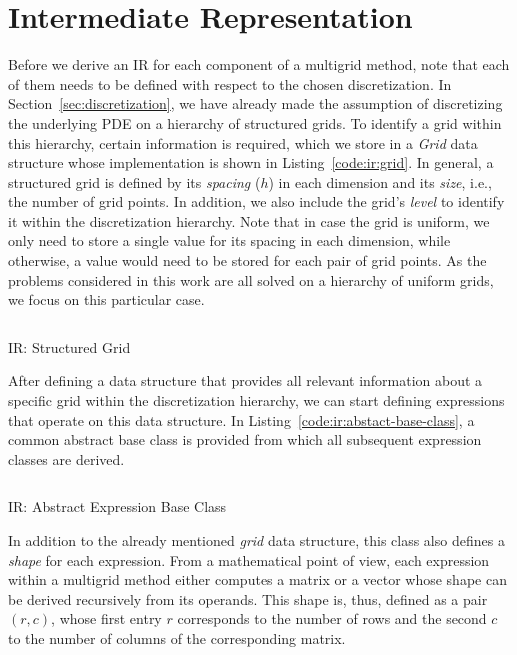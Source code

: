 \section{Intermediate Representation}
\label{sec:intermediate-representation}
Before we derive an IR for each component of a multigrid method, note that each of them needs to be defined with respect to the chosen discretization.
In Section~\ref{sec:discretization}, we have already made the assumption of discretizing the underlying PDE on a hierarchy of structured grids.
To identify a grid within this hierarchy, certain information is required, which we store in a \emph{Grid} data structure whose implementation is shown in Listing~\ref{code:ir:grid}.
In general, a structured grid is defined by its \emph{spacing} ($h$) in each dimension and its \emph{size}, i.e., the number of grid points.
In addition, we also include the grid's \emph{level} to identify it within the discretization hierarchy.
Note that in case the grid is uniform, we only need to store a single value for its spacing in each dimension, while otherwise, a value would need to be stored for each pair of grid points.
As the problems considered in this work are all solved on a hierarchy of uniform grids, we focus on this particular case.
\begin{listing}
	\inputminted{python}{evostencils/ir/grid.py}
	\caption{IR: Structured Grid}
	\label{code:ir:grid}
\end{listing}
After defining a data structure that provides all relevant information about a specific grid within the discretization hierarchy, we can start defining expressions that operate on this data structure.
In Listing~\ref{code:ir:abstact-base-class}, a common abstract base class is provided from which all subsequent expression classes are derived.
\begin{listing}
	\inputminted{python}{evostencils/ir/expression.py}
	\caption{IR: Abstract Expression Base Class}
	\label{code:ir:abstact-base-class}
\end{listing}
In addition to the already mentioned \emph{grid} data structure, this class also defines a \emph{shape} for each expression.
From a mathematical point of view, each expression within a multigrid method either computes a matrix or a vector whose shape can be derived recursively from its operands.
This shape is, thus, defined as a pair $(r, c)$, whose first entry $r$ corresponds to the number of rows and the second $c$ to the number of columns of the corresponding matrix.
